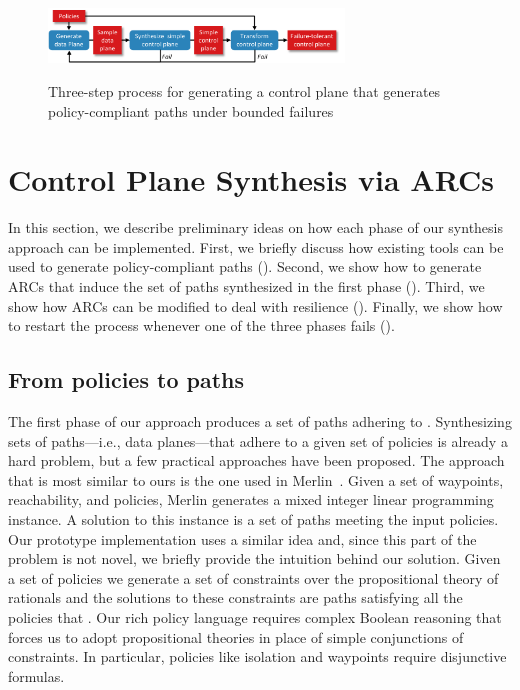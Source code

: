 \begin{figure}
\centering
\includegraphics[width=0.7\textwidth]{figures/process.pdf}
\label{fig:process}
\caption{Three-step process for generating a control plane that generates
    policy-compliant paths under bounded failures}
\end{figure}

\section{Control Plane Synthesis via ARCs} \label{sec:synthesis}
In this section, we describe preliminary ideas on how each phase of our synthesis 
approach can be implemented.
First, we briefly discuss how existing tools can be used to generate
policy-compliant paths ().
Second, we show how to generate ARCs that induce
the set of paths synthesized in the first phase ().
Third, we show how ARCs can be modified to deal with resilience ().
Finally, we show how to restart the process whenever one of the three phases fails ().

\subsection{From policies to paths}
The first phase of our approach produces a set of paths adhering to
.
Synthesizing sets of paths---i.e., data planes---that adhere to a given set of policies
is already a hard problem, but a few practical approaches have been proposed.
The approach that is most similar to ours is the one used in Merlin~\cite{merlin}.
Given a set of waypoints, reachability, and  policies,
Merlin generates a mixed integer linear programming instance. 
A solution to this instance is a set of paths meeting the input policies.
Our prototype implementation uses a similar idea and,
since this part of the problem is not novel, we briefly provide the intuition behind our solution.
Given a set of policies we generate a set of constraints over the propositional theory of rationals 
and the solutions to these constraints are paths satisfying all the policies that .
Our rich policy language requires complex Boolean reasoning that forces us to adopt propositional theories
in place of simple conjunctions of constraints.
In particular, policies like isolation and waypoints require disjunctive formulas.

